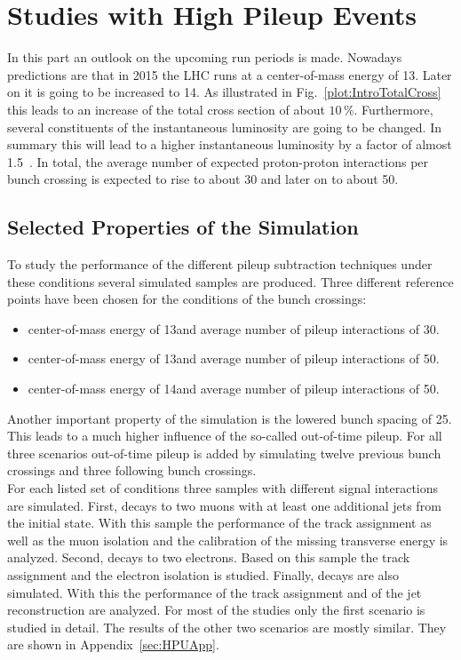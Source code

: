 \chapter{Studies with High Pileup Events \label{sec:HPU}}

In this part an outlook on the upcoming run periods is made. Nowadays predictions are that in 2015 the LHC runs at a center-of-mass energy of 13\TeV. Later on it is going to be increased to 14\TeV. As illustrated in Fig.~\ref{plot:IntroTotalCross} this leads to an increase of the total cross section of about $10\,\%$. Furthermore, several constituents of the instantaneous luminosity are going to be changed. In summary this will lead to a higher instantaneous luminosity by a factor of almost 1.5~\cite{LHCUpgrade}. In total, the average number of expected proton-proton interactions per bunch crossing is expected to rise to about 30 and later on to about 50.

\section{Selected Properties of the Simulation \label{sec:HPUSim}}

To study the performance of the different pileup subtraction techniques under these conditions several simulated samples are produced. Three different reference points have been chosen for the conditions of the bunch crossings:
\begin{itemize}
\item center-of-mass energy of 13\TeV and average number of pileup interactions of 30.
\item center-of-mass energy of 13\TeV and average number of pileup interactions of 50.
\item center-of-mass energy of 14\TeV and average number of pileup interactions of 50.
\end{itemize}
Another important property of the simulation is the lowered bunch spacing of 25\ns. This leads to a much higher influence of the so-called out-of-time pileup. For all three scenarios out-of-time pileup is added by simulating twelve previous bunch crossings and three following bunch crossings.\\
For each listed set of conditions three samples with different signal interactions are simulated. First, \Zz decays to two muons with at least one additional jets from the initial state. With this sample the performance of the track assignment as well as the muon isolation and the calibration of the missing transverse energy \ETmiss is analyzed. Second, \Zz decays to two electrons. Based on this sample the track assignment and the electron isolation is studied. Finally, \ttbar decays are also simulated. With this the performance of the track assignment and of the jet reconstruction are analyzed. For most of the studies only the first scenario is studied in detail. The results of the other two scenarios are mostly similar. They are shown in Appendix~\ref{sec:HPUApp}.

